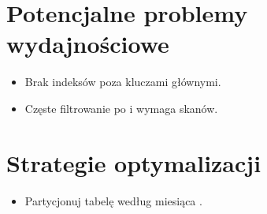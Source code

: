 \documentclass[a4paper,11pt,openany,english]{sphinxmanual}
\begin{document}
\section{Potencjalne problemy wydajnościowe}
\label{\detokenize{rozdzial4/index:potencjalne-problemy-wydajnosciowe}}\begin{itemize}
\item {} 
\sphinxAtStartPar
Brak indeksów poza kluczami głównymi.

\item {} 
\sphinxAtStartPar
Częste filtrowanie po  i  wymaga skanów.

\end{itemize}


\section{Strategie optymalizacji}
\label{\detokenize{rozdzial4/index:strategie-optymalizacji}}
\sphinxAtStartPar
{}

\begin{sphinxVerbatim}[commandchars=\\\{\}]
\end{sphinxVerbatim}

\sphinxAtStartPar
{}
\begin{itemize}
\item {} 
\sphinxAtStartPar
Partycjonuj tabelę  według miesiąca .

\end{itemize}
\end{document}
